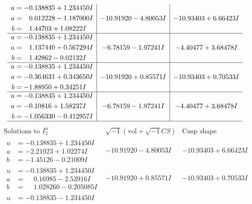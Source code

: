 \documentclass[1p]{elsarticle_modified}
\theoremstyle{definition}
\newcommand{\I}{\sqrt{-1}}
\begin{document}
$$\begin{array}{c|c|c}
\begin{aligned}
u &= -0.138835 + 1.234450 I \\
a &= \phantom{-}0.012228 - 1.187000 I \\
b &= \phantom{-}1.44703 + 1.08222 I\end{aligned}
 & -10.91920 - 4.80053 I & -10.93403 + 6.66423 I \\ \hline\begin{aligned}
u &= -0.138835 + 1.234450 I \\
a &= \phantom{-}1.137440 - 0.567294 I \\
b &= \phantom{-}1.42862 - 0.02132 I\end{aligned}
 & -6.78159 - 1.97241 I & -4.40477 + 3.68478 I \\ \hline\begin{aligned}
u &= -0.138835 + 1.234450 I \\
a &= -0.364631 + 0.343650 I \\
b &= -1.88950 + 0.34251 I\end{aligned}
 & -10.91920 + 0.85571 I & -10.93403 + 0.70533 I \\ \hline\begin{aligned}
u &= -0.138835 + 1.234450 I \\
a &= -0.10816 + 1.58237 I \\
b &= -1.056330 - 0.412957 I\end{aligned}
 & -6.78159 - 1.97241 I & -4.40477 + 3.68478 I\\
 \hline 
 \end{array}$$\newpage$$\begin{array}{c|c|c}  
\text{Solutions to }I^u_{2}& \I (\text{vol} + \sqrt{-1}CS) & \text{Cusp shape}\\
 \hline 
\begin{aligned}
u &= -0.138835 + 1.234450 I \\
a &= -2.21023 + 1.02274 I \\
b &= -1.45126 - 0.21009 I\end{aligned}
 & -10.91920 - 4.80053 I & -10.93403 + 6.66423 I \\ \hline\begin{aligned}
u &= -0.138835 + 1.234450 I \\
a &= \phantom{-}0.16985 - 2.53916 I \\
b &= \phantom{-}1.028260 - 0.205085 I\end{aligned}
 & -10.91920 + 0.85571 I & -10.93403 + 0.70533 I \\ \hline\begin{aligned}
u &= -0.138835 - 1.234450 I \\

\end{aligned}
\end{array}$$
\end{document}
